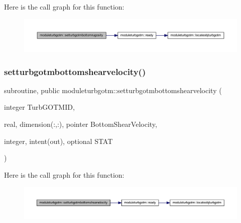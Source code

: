 Here is the call graph for this function\+:\nopagebreak
\begin{figure}[H]
\begin{center}
\leavevmode
\includegraphics[width=350pt]{namespacemoduleturbgotm_a2596446f2aa54a9db3ed26b9552952d6_cgraph}
\end{center}
\end{figure}
\mbox{\label{namespacemoduleturbgotm_a9e719059bf7bff5946e65a3d8157ada6}} 
\subsubsection{\texorpdfstring{setturbgotmbottomshearvelocity()}{setturbgotmbottomshearvelocity()}}
{\footnotesize\ttfamily subroutine, public moduleturbgotm\+::setturbgotmbottomshearvelocity (\begin{DoxyParamCaption}\item[{integer}]{Turb\+G\+O\+T\+M\+ID,  }\item[{real, dimension(\+:,\+:), pointer}]{Bottom\+Shear\+Velocity,  }\item[{integer, intent(out), optional}]{S\+T\+AT }\end{DoxyParamCaption})}

Here is the call graph for this function\+:\nopagebreak
\begin{figure}[H]
\begin{center}
\leavevmode
\includegraphics[width=350pt]{namespacemoduleturbgotm_a9e719059bf7bff5946e65a3d8157ada6_cgraph}
\end{center}
\end{figure}
\mbox{\label{namespacemoduleturbgotm_ac71371400c754c4786f6914ccc6d6c70}} 
